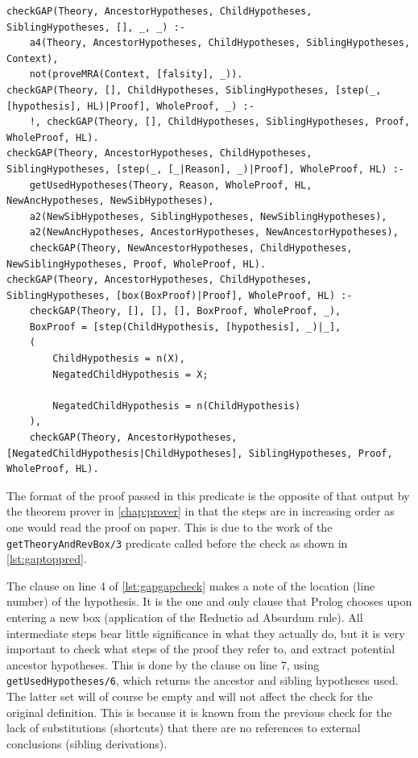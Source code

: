\documentclass[11pt,twoside,a4paper]{report}
\begin{document}
\begin{lstlisting}[caption={Checking whether a proof follows the Genuine Absurdity Property},label=lst:gapgapcheck]
% Checks for the actual GAP for each (sub)derivation in the proof
checkGAP(Theory, AncestorHypotheses, ChildHypotheses, SiblingHypotheses, [], _, _) :-
	a4(Theory, AncestorHypotheses, ChildHypotheses, SiblingHypotheses, Context),
	not(proveMRA(Context, [falsity], _)).
checkGAP(Theory, [], ChildHypotheses, SiblingHypotheses, [step(_, [hypothesis], HL)|Proof], WholeProof, _) :-
	!, checkGAP(Theory, [], ChildHypotheses, SiblingHypotheses, Proof, WholeProof, HL).
checkGAP(Theory, AncestorHypotheses, ChildHypotheses, SiblingHypotheses, [step(_, [_|Reason], _)|Proof], WholeProof, HL) :-
	getUsedHypotheses(Theory, Reason, WholeProof, HL, NewAncHypotheses, NewSibHypotheses),
	a2(NewSibHypotheses, SiblingHypotheses, NewSiblingHypotheses),
	a2(NewAncHypotheses, AncestorHypotheses, NewAncestorHypotheses),
	checkGAP(Theory, NewAncestorHypotheses, ChildHypotheses, NewSiblingHypotheses, Proof, WholeProof, HL).
checkGAP(Theory, AncestorHypotheses, ChildHypotheses, SiblingHypotheses, [box(BoxProof)|Proof], WholeProof, HL) :-
	checkGAP(Theory, [], [], [], BoxProof, WholeProof, _),
	BoxProof = [step(ChildHypothesis, [hypothesis], _)|_],
	(
		ChildHypothesis = n(X),
		NegatedChildHypothesis = X;
		
		NegatedChildHypothesis = n(ChildHypothesis)
	),
	checkGAP(Theory, AncestorHypotheses, [NegatedChildHypothesis|ChildHypotheses], SiblingHypotheses, Proof, WholeProof, HL).
\end{lstlisting}

The format of the proof passed in this predicate is the opposite of that output by the theorem prover in \autoref{chap:prover} in that the steps are in increasing order as one would read the proof on paper. This is due to the work of the \lstinline$getTheoryAndRevBox/3$ predicate called before the check as shown in \autoref{lst:gaptoppred}.

The clause on line 4 of \autoref{lst:gapgapcheck} makes a note of the location (line number) of the hypothesis. It is the one and only clause that Prolog chooses upon entering a new box (application of the Reductio ad Absurdum rule). All intermediate steps bear little significance in what they actually do, but it is very important to check what steps of the proof they refer to, and extract potential ancestor hypotheses. This is done by the clause on line 7, using \lstinline$getUsedHypotheses/6$, which returns the ancestor and sibling hypotheses used. The latter set will of course be empty and will not affect the check for the original definition. This is because it is known from the previous check for the lack of substitutions (shortcuts) that there are no references to external conclusions (sibling derivations).
\end{document}
